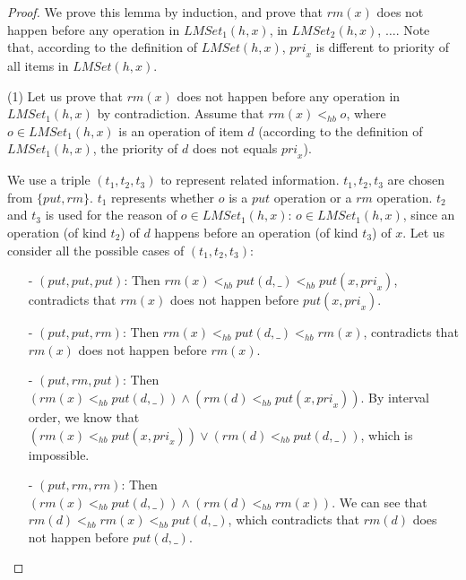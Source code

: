 \documentclass{llncs}
\begin{document}
\begin {proof}

We prove this lemma by induction, and prove that $\textit{rm}(x)$ does not happen before any operation in $\textit{LMSet}_1(h,x)$, in $\textit{LMSet}_2(h,x)$, $\ldots$. Note that, according to the definition of $\textit{LMSet}(h,x)$, $\textit{pri}_x$ is different to priority of all items in $\textit{LMSet}(h,x)$.

\noindent (1) Let us prove that $\textit{rm}(x)$ does not happen before any operation in $\textit{LMSet}_1(h,x)$ by contradiction. Assume that $\textit{rm}(x) <_{hb} o$, where $o \in \textit{LMSet}_1(h,x)$ is an operation of item $d$ (according to the definition of $\textit{LMSet}_1(h,x)$, the priority of $d$ does not equals $\textit{pri}_x$).

We use a triple $(t_1,t_2,t_3)$ to represent related information. $t_1,t_2,t_3$ are chosen from $\{ \textit{put},\textit{rm} \}$. $t_1$ represents whether $o$ is a $\textit{put}$ operation or a $\textit{rm}$ operation. $t_2$ and $t_3$ is used for the reason of $o \in \textit{LMSet}_1(h,x)$: $o \in \textit{LMSet}_1(h,x)$, since an operation (of kind $t_2$) of $d$ happens before an operation (of kind $t_3$) of $x$. Let us consider all the possible cases of $(t_1,t_2,t_3)$:

\begin{itemize}
\setlength{\itemsep}{0.5pt}
\item[-] $(\textit{put},\textit{put},\textit{put})$: Then $\textit{rm}(x) <_{hb} \textit{put}(d,\_) <_{hb} \textit{put}(x,\textit{pri}_x)$, contradicts that $\textit{rm}(x)$ does not happen before $\textit{put}(x,\textit{pri}_x)$.

\item[-] $(\textit{put},\textit{put},\textit{rm})$: Then $\textit{rm}(x) <_{hb} \textit{put}(d,\_) <_{hb} \textit{rm}(x)$, contradicts that $\textit{rm}(x)$ does not happen before $\textit{rm}(x)$.

\item[-] $(\textit{put},\textit{rm},\textit{put})$: Then $( \textit{rm}(x) <_{hb} \textit{put}(d,\_) ) \wedge ( \textit{rm}(d) <_{hb} \textit{put}(x,\textit{pri}_x) )$. By interval order, we know that $( \textit{rm}(x) <_{hb} \textit{put}(x,\textit{pri}_x) ) \vee ( \textit{rm}(d) <_{hb} \textit{put}(d,\_) )$, which is impossible.

\item[-] $(\textit{put},\textit{rm},\textit{rm})$: Then $( \textit{rm}(x) <_{hb} \textit{put}(d,\_) ) \wedge ( \textit{rm}(d) <_{hb} \textit{rm}(x) )$. We can see that $\textit{rm}(d) <_{hb} \textit{rm}(x) <_{hb} \textit{put}(d,\_)$, which contradicts that $\textit{rm}(d)$ does not happen before $\textit{put}(d,\_)$.


\end{itemize}
\end{proof}
\end{document}
